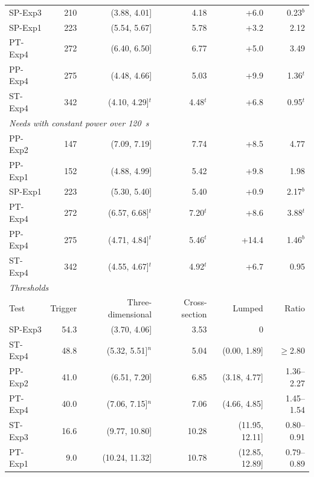 \begin{table}[!tbp]
\begin{tabular}{lrrrrr}
SP-Exp3 & 210 & (3.88, 4.01] & 4.18 & +6.0 & 0.23$^{b}$ \\
SP-Exp1 & 223 & (5.54, 5.67] & 5.78 & +3.2 & 2.12 \\
PT-Exp4 & 272 & (6.40, 6.50] & 6.77 & +5.0 & 3.49 \\
PP-Exp4 & 275 & (4.48, 4.66] & 5.03 & +9.9 & 1.36$^{t}$ \\
ST-Exp4 & 342 & (4.10, 4.29]$^{t}$ & 4.48$^{t}$ & +6.8 & 0.95$^{t}$ \\
\midrule
\multicolumn{6}{l}{\textit{Needs with constant power over 120~s}} \\
PP-Exp2 & 147 & (7.09, 7.19] & 7.74 & +8.5 & 4.77 \\
PP-Exp1 & 152 & (4.88, 4.99] & 5.42 & +9.8 & 1.98 \\
SP-Exp1 & 223 & (5.30, 5.40] & 5.40 & +0.9 & 2.17$^{b}$ \\
PT-Exp4 & 272 & (6.57, 6.68]$^{t}$ & 7.20$^{t}$ & +8.6 & 3.88$^{t}$ \\
PP-Exp4 & 275 & (4.71, 4.84]$^{t}$ & 5.46$^{t}$ & +14.4 & 1.46$^{b}$ \\
ST-Exp4 & 342 & (4.55, 4.67]$^{t}$ & 4.92$^{t}$ & +6.7 & 0.95 \\
\midrule
\multicolumn{6}{l}{\textit{Thresholds}} \\
Test & Trigger & Three-dimensional & Cross-section & Lumped & Ratio \\
\midrule
SP-Exp3 & 54.3 & (3.70, 4.06] & 3.53 & 0 &  \\
ST-Exp4 & 48.8 & (5.32, 5.51]$^{n}$ & 5.04 & (0.00, 1.89] & $\geq$2.80 \\
PP-Exp2 & 41.0 & (6.51, 7.20] & 6.85 & (3.18, 4.77] & 1.36--2.27 \\
PT-Exp4 & 40.0 & (7.06, 7.15]$^{n}$ & 7.06 & (4.66, 4.85] & 1.45--1.54 \\
ST-Exp3 & 16.6 & (9.77, 10.80] & 10.28 & (11.95, 12.11] & 0.80--0.91 \\
PT-Exp1 & 9.0 & (10.24, 11.32] & 10.78 & (12.85, 12.89] & 0.79--0.89 \\
\bottomrule
\end{tabular}
\end{table}
